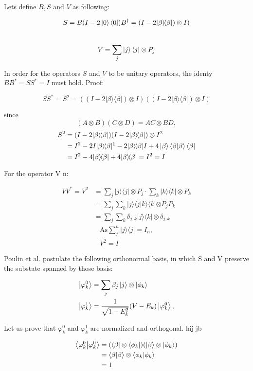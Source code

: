 \documentclass{article}
\def\bracket#1#2{\langle #1 | #2 \rangle}
\def\kb#1#2{| #1 \rangle\!\langle #2 |}
\def\kbtwo#1#2#3#4{|#1 \rangle\!\langle #2 | #3 \rangle\!\langle #4 | }
\begin{document}
Lets define $B, S$ and  $V$ as following:

$$
S = B (I - 2 \ket{0}\bra{0}) B^{\dagger}= (I-2\kb \beta \beta) \otimes I)$$
\\
$$
V=\sum_{j}\ket{j}\bra{j} \otimes P_{j}
$$

In order for the operators $S$ and $V$ to be unitary operators, the identy $BB^* = SS^* = I$ must hold. Proof:

$$
SS^* = S^2 = ((I-2\kb \beta \beta) \otimes I)((I-2\kb \beta \beta) \otimes I)
$$

since $$(A \otimes B)(C \otimes D) = AC \otimes BD,$$
\begin{align*}
S^2 &= (I-2\kb \beta \beta)(I-2\kb \beta \beta) \otimes I^2 \\
&= I^2 - 2I\kb \beta \beta\footnotemark - 2\kb \beta \beta I + 4 \ket{\beta} \bracket \beta \beta \bra \beta\\
&= I^2 - 4\kb \beta \beta + 4\kb \beta \beta = I^2 = I
\end{align*}



For the operator V n:

\begin{align*}
VV^* = V^2 &= \sum_{j} \kb jj \otimes P_{j} \cdot \sum_{k} \kb kk \otimes P_{k} \\
&= \sum_j \sum_k \kbtwo j j k k \otimes P_j P_k\\
&= \sum_j \sum_k \delta_{j,k} | j \rangle \langle k | \otimes \delta_{j,k}
\end{align*}
\begin{gather*}
\text{As}  \sum_{j}^{n} \kb jj = I_n, \\
V^2 = I
\end{gather*}

Poulin et al. postulate the following orthonormal basis, in which S and V preserve the substate spanned by those basis:

\begin{align}
\ket{\varphi_k^0} &= \sum_j\beta_j\ket j\otimes\ket{\phi_k} \\
\ket{\varphi_k^1} &= \frac 1{\sqrt{1-E_k^2}}(V-E_k)\ket{\varphi_k^0},
\end{align}
\newpage

Let us prove that $\varphi_k^0$ and $\varphi_k^1$ are normalized and orthogonal. hij jb

\begin{align*}
\braket{\varphi_k^0}{\varphi_k^0}  &= (\bra{\beta} \otimes \bra{\phi_k})(\ket{\beta} \otimes \ket{\phi_k})\\
&= \braket{\beta}{\beta} \otimes \braket{\phi_k}{\phi_k}\\
&= 1
\end{align*}
\end{document}
